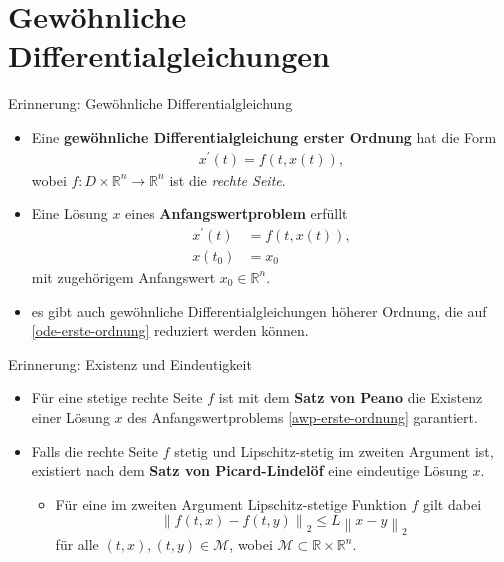 \section{Gewöhnliche Differentialgleichungen}

\begin{frame}{Erinnerung: Gewöhnliche Differentialgleichung}
    \begin{itemize}
        \item<1-> Eine \textbf{gewöhnliche Differentialgleichung erster Ordnung} hat die Form
        \begin{align}
            \label{ode-erste-ordnung}
            x^{\prime}(t) = f(t, x(t)),
        \end{align}
        wobei $f : D \times \mathbb{R}^{n} \rightarrow \mathbb{R}^{n}$ ist die \textit{rechte Seite}.
        \item<2-> Eine Lösung $x$ eines \textbf{Anfangswertproblem} erfüllt
        \begin{align}
            \label{awp-erste-ordnung}
            x^{\prime}(t) &= f(t, x(t)), \nonumber\\
            x(t_{0})&=x_{0}
        \end{align}
        mit zugehörigem Anfangswert $x_0 \in \mathbb{R}^n$.
        \item<3-> es gibt auch gewöhnliche Differentialgleichungen höherer Ordnung, die auf \eqref{ode-erste-ordnung}
        reduziert werden können.
    \end{itemize}
\end{frame}

\begin{frame}{Erinnerung: Existenz und Eindeutigkeit}
    \begin{itemize}
        \item<1-> Für eine stetige rechte Seite $f$ ist mit dem \textbf{Satz von Peano} die Existenz einer Lösung
        $x$ des Anfangswertproblems \eqref{awp-erste-ordnung} garantiert.
        \item<2-> Falls die rechte Seite $f$ stetig und Lipschitz-stetig im zweiten Argument ist, existiert nach
        dem \textbf{Satz von Picard-Lindelöf} eine eindeutige Lösung $x$.
        \begin{itemize}
            \item<1-> Für eine im zweiten Argument Lipschitz-stetige Funktion $f$ gilt dabei
            \[
                \left\lVert f(t,x) - f(t,y) \right\rVert_2 \leq L \left\lVert x -y \right\rVert_2
            \]
            für alle $(t,x), (t,y) \in \mathcal{M}$, wobei
            $\mathcal{M}\subset \mathbb{R} \times \mathbb{R}^n$.
        \end{itemize}
    \end{itemize}
\end{frame}

